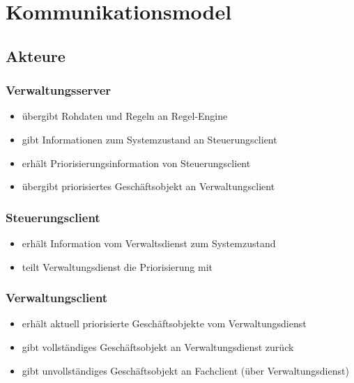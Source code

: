 \chapter{Kommunikationsmodel}

\section{Akteure}

\subsection*{Verwaltungsserver}
\begin{itemize}
\item übergibt Rohdaten und Regeln an Regel-Engine
\item gibt Informationen zum Systemzustand an Steuerungsclient
\item erhält Priorisierungsinformation von Steuerungsclient
\item übergibt priorisiertes Geschäftsobjekt an Verwaltungsclient
\end{itemize}

\subsection*{Steuerungsclient}
\begin{itemize}
\item erhält Information vom Verwaltsdienst zum Systemzustand %
\item teilt Verwaltungsdienst die Priorisierung mit%
\end{itemize}

\subsection*{Verwaltungsclient}
\begin{itemize}
\item erhält aktuell priorisierte Geschäftsobjekte vom Verwaltungsdienst
\item gibt vollständiges Geschäftsobjekt an Verwaltungsdienst zurück
\item gibt unvollständiges Geschäftsobjekt an Fachclient (über Verwaltungsdienst)
\end{itemize}

